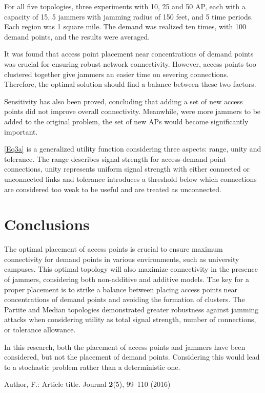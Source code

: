 \documentclass[runningheads]{llncs}
\begin{document}
	For all five topologies, three experiments with 10, 25 and 50 AP, each with a capacity of 15, 5 jammers with jamming radius of 150 feet, and 5 time periods. Each region was 1 square mile. The demand was realized ten times, with 100 demand points, and the results were averaged.
	
	It was found that access point placement near concentrations of demand points was crucial for ensuring robust network connectivity. However, access points too clustered together give jammers an easier time on severing connections. Therefore, the optimal solution should find a balance between these two factors. 
	
	Sensitivity has also been proved, concluding that adding a set of new access points did not improve overall connectivity. Meanwhile, were more jammers to be added to the original problem, the set of new APs would become significantly important.
	
	\ref{Eq3a} is a generalized utility function considering three aspects: range, unity and tolerance.
	The range describes signal strength for access-demand point connections, unity represents uniform signal strength with either connected or unconnected links and tolerance introduces a threshold below which connections are considered too weak to be useful and are treated as unconnected.
	
	
	
	\section{Conclusions}
	
	The optimal placement of access points is crucial to ensure maximum connectivity for demand points in various environments, such as university campuses. This optimal topology will also maximize connectivity in the presence of jammers, considering both non-additive and additive models.
	The key for a proper placement is to strike a balance between placing access points near concentrations of demand points and avoiding the formation of clusters.	The Partite and Median topologies demonstrated greater robustness against jamming attacks when considering utility as total signal strength, number of connections, or tolerance allowance.
	
	In this research, both the placement of access points and jammers have been considered, but not the placement of demand points. Considering this would lead to a stochastic problem rather than a deterministic one.
	
	
	\begin{thebibliography}{8}
		Author, F.: Article title. Journal \textbf{2}(5), 99--110 (2016)
		
	\end{thebibliography}
\end{document}
